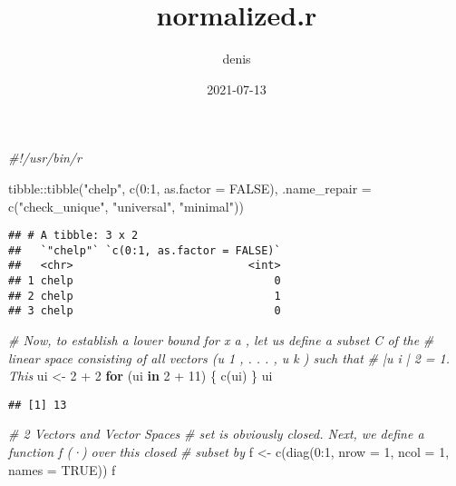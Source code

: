 \documentclass[
]{article}
\title{normalized.r}
\author{denis}
\date{2021-07-13}
\newenvironment{Shaded}{\begin{snugshade}}{\end{snugshade}}
\newcommand{\AttributeTok}[1]{\textcolor[rgb]{0.77,0.63,0.00}{#1}}
\newcommand{\CommentTok}[1]{\textcolor[rgb]{0.56,0.35,0.01}{\textit{#1}}}
\newcommand{\ConstantTok}[1]{\textcolor[rgb]{0.00,0.00,0.00}{#1}}
\newcommand{\ControlFlowTok}[1]{\textcolor[rgb]{0.13,0.29,0.53}{\textbf{#1}}}
\newcommand{\DecValTok}[1]{\textcolor[rgb]{0.00,0.00,0.81}{#1}}
\newcommand{\FunctionTok}[1]{\textcolor[rgb]{0.00,0.00,0.00}{#1}}
\newcommand{\NormalTok}[1]{#1}
\newcommand{\OtherTok}[1]{\textcolor[rgb]{0.56,0.35,0.01}{#1}}
\newcommand{\SpecialCharTok}[1]{\textcolor[rgb]{0.00,0.00,0.00}{#1}}
\newcommand{\StringTok}[1]{\textcolor[rgb]{0.31,0.60,0.02}{#1}}
\begin{document}
\maketitle

\begin{Shaded}
\begin{Highlighting}[]
\CommentTok{\#!/usr/bin/r}

\NormalTok{tibble}\SpecialCharTok{::}\FunctionTok{tibble}\NormalTok{(}\StringTok{"chelp"}\NormalTok{, }\FunctionTok{c}\NormalTok{(}\DecValTok{0}\SpecialCharTok{:}\DecValTok{1}\NormalTok{, }\AttributeTok{as.factor =} \ConstantTok{FALSE}\NormalTok{), }
               \AttributeTok{.name\_repair =} \FunctionTok{c}\NormalTok{(}\StringTok{"check\_unique"}\NormalTok{, }\StringTok{"universal"}\NormalTok{, }\StringTok{"minimal"}\NormalTok{))}
\end{Highlighting}
\end{Shaded}

\begin{verbatim}
## # A tibble: 3 x 2
##   `"chelp"` `c(0:1, as.factor = FALSE)`
##   <chr>                           <int>
## 1 chelp                               0
## 2 chelp                               1
## 3 chelp                               0
\end{verbatim}

\begin{Shaded}
\begin{Highlighting}[]
\CommentTok{\# Now, to establish a lower bound for x a , let us deﬁne a subset C of the}
\CommentTok{\# linear space consisting of all vectors (u 1 , . . . , u k ) such that}
\CommentTok{\# |u i | 2 = 1. This}
\NormalTok{ui }\OtherTok{\textless{}{-}} \DecValTok{2} \SpecialCharTok{+} \DecValTok{2}
\ControlFlowTok{for}\NormalTok{ (ui }\ControlFlowTok{in}  \DecValTok{2} \SpecialCharTok{+} \DecValTok{11}\NormalTok{) \{}
     \FunctionTok{c}\NormalTok{(ui)}
\NormalTok{\}}
\NormalTok{ui}
\end{Highlighting}
\end{Shaded}

\begin{verbatim}
## [1] 13
\end{verbatim}

\begin{Shaded}
\begin{Highlighting}[]
\CommentTok{\# 2 Vectors and Vector Spaces}
\CommentTok{\# set is obviously closed. Next, we define a function f (·) over this closed }
\CommentTok{\# subset by}
\NormalTok{f }\OtherTok{\textless{}{-}} \FunctionTok{c}\NormalTok{(}\FunctionTok{diag}\NormalTok{(}\DecValTok{0}\SpecialCharTok{:}\DecValTok{1}\NormalTok{, }\AttributeTok{nrow =} \DecValTok{1}\NormalTok{, }\AttributeTok{ncol =} \DecValTok{1}\NormalTok{, }\AttributeTok{names =} \ConstantTok{TRUE}\NormalTok{))}
\NormalTok{f}
\end{Highlighting}
\end{Shaded}
\end{document}
